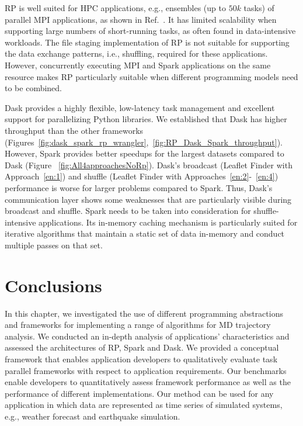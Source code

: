RP is well suited for HPC applications, e.g., ensembles (up to $50k$
tasks) of parallel MPI applications, as shown in
Ref.~\cite{merzky2018design,merzky2019using}. It has limited scalability when
supporting large numbers of short-running tasks, as often found in
data-intensive workloads. The file staging implementation of RP is
not suitable for supporting the data exchange patterns, i.e., shuffling, required
for these applications. However, concurrently executing MPI and Spark applications
on the same resource makes RP particularly suitable when different
programming models need to be combined.

Dask provides a highly flexible, low-latency task management and excellent
support for parallelizing Python libraries. We established that Dask has higher
throughput than the other frameworks
(Figures~\ref{fig:dask_spark_rp_wrangler},~\ref{fig:RP_Dask_Spark_throughput}).
However, Spark provides better speedups for the largest datasets compared to
Dask (Figure ~\ref{fig:All4approachesNoRp}). Dask's broadcast (Leaflet Finder
with Approach~\ref{en:1}) and shuffle (Leaflet Finder with
Approaches~\ref{en:2}-~\ref{en:4}) performance is worse for larger problems
compared to Spark. Thus, Dask's communication layer shows some weaknesses that
are particularly visible during broadcast and shuffle. Spark needs to be taken
into consideration for shuffle-intensive applications. Its in-memory caching
mechanism is particularly suited for iterative algorithms that maintain a static
set of data in-memory and conduct multiple passes on that set.

\section{Conclusions}
\label{sec:tp_concl}

In this chapter, we investigated the use of different programming abstractions
and frameworks for implementing a range of algorithms for MD trajectory
analysis. We conducted an in-depth analysis of applications' characteristics and
assessed the architectures of RP, Spark and Dask. We provided a
conceptual framework that enables application developers to qualitatively
evaluate task parallel frameworks with respect to application requirements. Our
benchmarks enable developers to quantitatively assess framework performance as
well as the performance of different implementations. Our method can be used for
any application in which data are represented as time series of simulated
systems, e.g., weather forecast and earthquake simulation.

